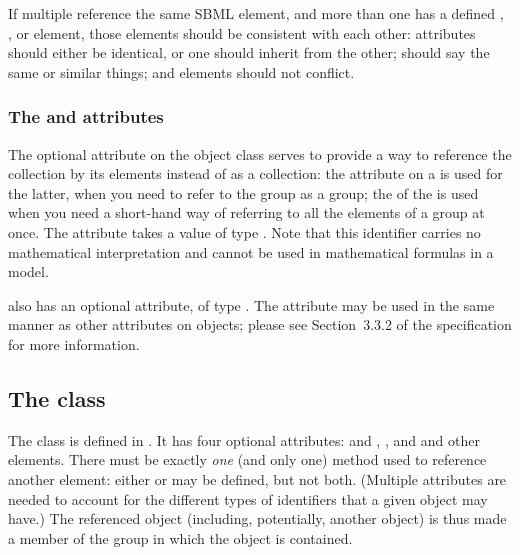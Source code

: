 If multiple \ListOfMembers {} reference the same SBML element, and more than one  has a defined , \Notes, or \Annotation element, those elements should be consistent with each other:   attributes should either be identical, or one should inherit from the other; \Notes should say the same or similar things; and \Annotation elements should not conflict.

\begin{blockChanged}
\subsubsection{The \fixttspace{} and \fixttspace{} attributes}
\label{listofmembers-idname-attributes}

The optional  attribute on the \ListOfMembers object class serves to provide a way to reference the collection by its elements instead of as a collection:  the  attribute on a \Group is used for the latter, when you need to refer to the group as a group; the  of the \ListOfMembers is used when you need a short-hand way of referring to all the elements of a group at once.  The attribute takes a value of type .  Note that this identifier carries no mathematical interpretation and cannot be used in mathematical formulas in a model.

\ListOfMembers also has an optional  attribute, of type .  The  attribute may be used in the same manner as other  attributes on \sbmlthreecore objects; please see Section~3.3.2 of the \sbmlthreecore specification for more information.
\end{blockChanged}


\subsection{The  class}
\label{member-class}

The \Member class is defined in .  It has four optional attributes:  and , , and  and   other elements.  There must be exactly \emph{one} (and only one) method used to reference another element: either  or  may be defined, but not both.  (Multiple attributes are needed to account for the different types of identifiers that a given object may have.)  The referenced object (including, potentially, another \Group object) is thus made a member of the group in which the \Member object is contained.

